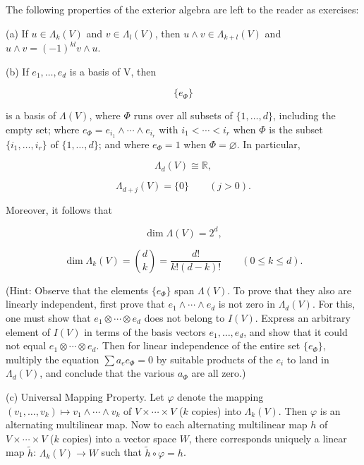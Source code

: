\label{thm:2.6}
The following properties of the exterior algebra are left to the reader as exercises:

(a)  If $u \in \Lambda_k(V) $ and  $ v \in \Lambda_l(V) $, then  $ u \land v \in \Lambda_{k+l}(V) $ and  $ u \land v = (-1)^{kl} v \land u $.

(b) If  $ e_{1}, \ldots, e_{d} $ is a basis of V, then


\begin{equation}
\tag{1}\label{eq:2.6:1}
\{e_{\Phi}\}
\end{equation}

is a basis of $\Lambda(V)$, where $\Phi$ runs over all subsets of $\{1, \ldots, d\}$, including the empty set; where $e_{\Phi} = e_{i_1} \wedge \cdots \wedge e_{i_r}$ with $i_1 < \cdots < i_r$ when $\Phi$ is the subset $\{i_1, \ldots, i_r\}$ of $\{1, \ldots, d\}$; and where $e_{\Phi} = 1$ when $\Phi = \varnothing$. In particular,

\[
\Lambda_{d}(V)\cong\mathbb{R},
\]

\begin{equation}
\tag{2}\label{eq:2.6:2}
\Lambda_{d+j}(V)=\{0\}\qquad(j>0).
\end{equation}

Moreover, it follows that

\[
\dim\Lambda(V)=2^{d},
\]

\begin{equation}
\tag{3}\label{eq:2.6:3}
\dim\Lambda_{k}(V)=\binom{d}{k}=\frac{d!}{k!(d-k)!}\qquad(0\leq k\leq d).
\end{equation}

(Hint: Observe that the elements $\{e_\Phi\}$ span $\Lambda(V)$. To prove that they also are linearly independent, first prove that $e_1 \wedge \cdots \wedge e_d$ is not zero in $\Lambda_d(V)$. For this, one must show that $e_1 \otimes \cdots \otimes e_d$ does not belong to $I(V)$. Express an arbitrary element of $I(V)$ in terms of the basis vectors $e_1, \ldots, e_d$, and show that it could not equal $e_1 \otimes \cdots \otimes e_d$. Then for linear independence of the entire set $\{e_\Phi\}$, multiply the equation $\sum a_e e_\Phi = 0$ by suitable products of the $e_i$ to land in $\Lambda_d(V)$, and conclude that the various $a_\Phi$ are all zero.)

(c) Universal Mapping Property. Let $\varphi$ denote the mapping $(v_1, \ldots, v_k) \mapsto v_1 \wedge \cdots \wedge v_k$ of $V \times \cdots \times V$ ($k$ copies) into $\Lambda_k(V)$. Then $\varphi$ is an alternating multilinear map. Now to each alternating multilinear map $h$ of $V \times \cdots \times V$ ($k$ copies) into a vector space $W$, there corresponds uniquely a linear map $\tilde{h}$: $\Lambda_k(V) \to W$ such that $\tilde{h} \circ \varphi = h$. 


